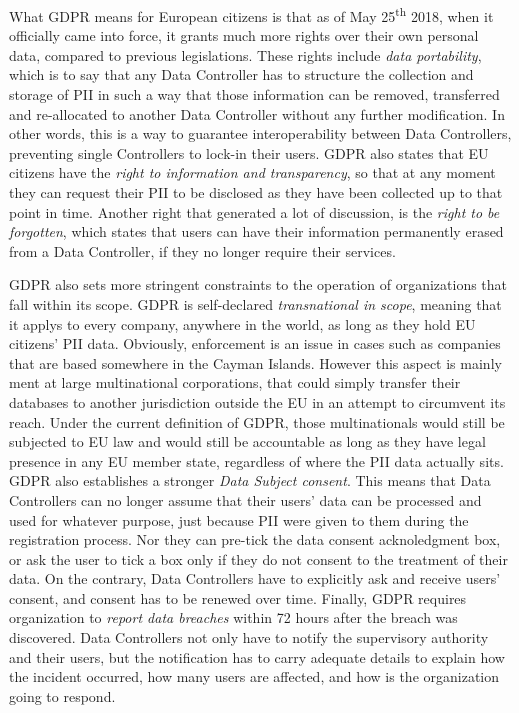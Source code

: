 What GDPR means for European citizens is that as of May 25\textsuperscript{th}
2018, when it officially came into force, it grants much more rights over their
own personal data, compared to previous legislations. These rights include
\emph{data portability}, which is to say that any Data Controller has to
structure the collection and storage of PII in such a way that those information
can be removed, transferred and re-allocated to another Data Controller without
any further modification. In other words, this is a way to guarantee
interoperability between Data Controllers, preventing single Controllers to
lock-in their users. GDPR also states that EU citizens have the \emph{right to
information and transparency}, so that at any moment they can request their PII
to be disclosed as they have been collected up to that point in time. Another
right that generated a lot of discussion, is the \emph{right to be forgotten}, which
states that users can have their information permanently erased from a Data
Controller, if they no longer require their services.

GDPR also sets more stringent constraints to the operation of organizations
that fall within its scope. GDPR is self-declared \emph{transnational in scope},
meaning that it applys to every company, anywhere in the world, as long as they hold EU
citizens' PII data. Obviously, enforcement is an issue in cases such as
companies that are based somewhere in the Cayman Islands. However this aspect is
mainly ment at large multinational corporations, that could simply
transfer their databases to another jurisdiction outside the EU in an attempt
to circumvent its reach. Under the current definition of GDPR, those
multinationals would still be subjected to EU law and would still be
accountable as long as they have legal presence in any EU member state,
regardless of where the PII data actually sits. GDPR also establishes a stronger
\emph{Data Subject consent}. This means that Data Controllers can no longer
assume that their users' data can be processed and used for whatever purpose,
just because PII were given to them during the registration process. Nor they
can pre-tick the data consent acknoledgment box, or ask the  user to tick a box
only if they do not consent to the treatment of their data. On the contrary,
Data Controllers have to explicitly ask and receive users' consent, and consent
has to be renewed over time. Finally, GDPR requires organization to \emph{report
data breaches} within 72 hours after the breach was discovered. Data Controllers
not only have to notify the supervisory authority and their users, but the
notification has to carry adequate details to explain  how the incident
occurred, how many users are affected, and how is the organization going to respond.

